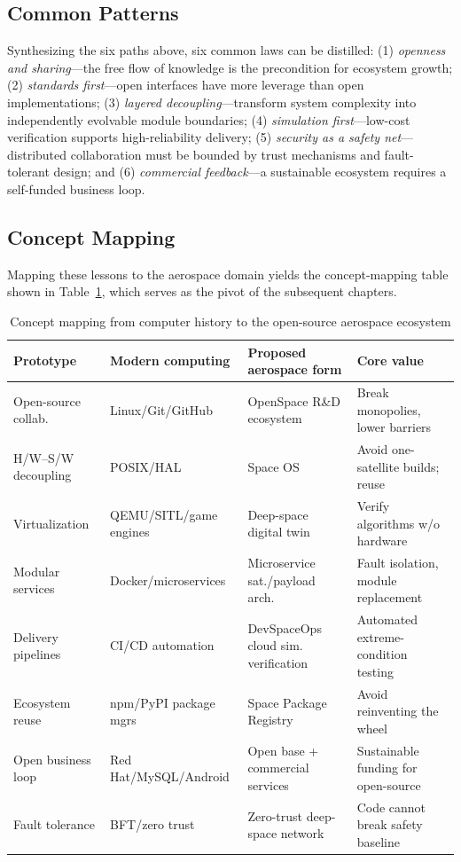 \documentclass[11pt]{article}
\begin{document}
\subsection{Common Patterns}
Synthesizing the six paths above, six common laws can be distilled: (1) \emph{openness and sharing}---the free flow of knowledge is the precondition for ecosystem growth; (2) \emph{standards first}---open interfaces have more leverage than open implementations; (3) \emph{layered decoupling}---transform system complexity into independently evolvable module boundaries; (4) \emph{simulation first}---low-cost verification supports high-reliability delivery; (5) \emph{security as a safety net}---distributed collaboration must be bounded by trust mechanisms and fault-tolerant design; and (6) \emph{commercial feedback}---a sustainable ecosystem requires a self-funded business loop.

\subsection{Concept Mapping}
Mapping these lessons to the aerospace domain yields the concept-mapping table shown in Table~\ref{tab:mapping}, which serves as the pivot of the subsequent chapters.

\begin{table}[htbp]
\centering
\footnotesize
\caption{Concept mapping from computer history to the open-source aerospace ecosystem}
\label{tab:mapping}
\begin{tabularx}{\textwidth}{@{}>{\raggedright\arraybackslash}p{2.8cm}>{\raggedright\arraybackslash}p{2.8cm}>{\raggedright\arraybackslash}p{2.8cm}>{\raggedright\arraybackslash}p{2.8cm}@{}}
\toprule
Prototype & Modern computing & Proposed aerospace form & Core value \\
\midrule
Open-source collab. & Linux/Git/GitHub & OpenSpace R\&D ecosystem & Break monopolies, lower barriers \\
H/W--S/W decoupling & POSIX/HAL & Space OS & Avoid one-satellite builds; reuse \\
Virtualization & QEMU/SITL/game engines & Deep-space digital twin & Verify algorithms w/o hardware \\
Modular services & Docker/microservices & Microservice sat./payload arch. & Fault isolation, module replacement \\
Delivery pipelines & CI/CD automation & DevSpaceOps cloud sim. verification & Automated extreme-condition testing \\
Ecosystem reuse & npm/PyPI package mgrs & Space Package Registry & Avoid reinventing the wheel \\
Open business loop & Red Hat/MySQL/Android & Open base + commercial services & Sustainable funding for open-source \\
Fault tolerance & BFT/zero trust & Zero-trust deep-space network & Code cannot break safety baseline \\
\bottomrule
\end{tabularx}
\end{table}
\end{document}

